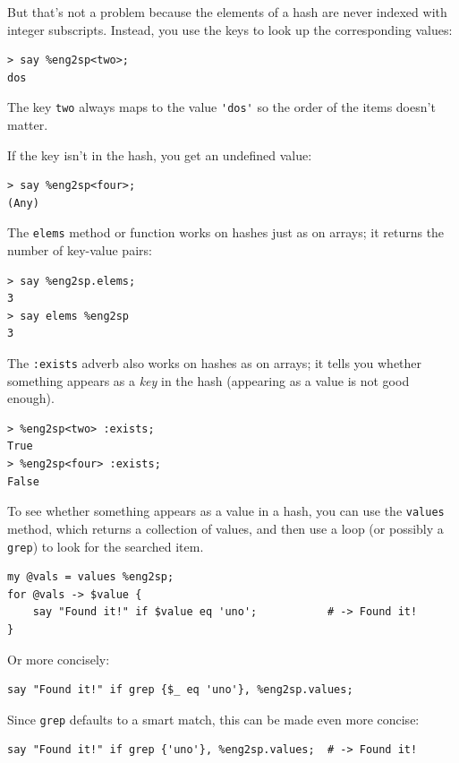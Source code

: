 But that's not a problem because the elements of a hash 
are never indexed with integer subscripts. Instead, you use 
the keys to look up the corresponding values:

\begin{verbatim}
> say %eng2sp<two>;
dos
\end{verbatim}
%
The key \verb"two" always maps to the value \verb"'dos'" 
so the order of the items doesn't matter.

If the key isn't in the hash, you get an undefined value:

\begin{verbatim}
> say %eng2sp<four>;
(Any)
\end{verbatim}
%
The {\tt elems} method or function works on hashes just 
as on arrays; it returns the number of key-value pairs:


\begin{verbatim}
> say %eng2sp.elems;
3
> say elems %eng2sp
3
\end{verbatim}
%
The {\tt :exists} adverb also works on hashes as on 
arrays; it tells you whether
something appears as a {\em key} in the hash (appearing
as a value is not good enough).

\begin{verbatim}
> %eng2sp<two> :exists;
True
> %eng2sp<four> :exists;
False
\end{verbatim}
%
To see whether something appears as a value in a hash, you
can use the {\tt values} method, which returns a collection of
values, and then use a loop (or possibly a {\tt grep}) to 
look for the searched item.

\begin{verbatim}
my @vals = values %eng2sp;
for @vals -> $value {
    say "Found it!" if $value eq 'uno';           # -> Found it!
}
\end{verbatim}
%
Or more concisely:
\begin{verbatim}
say "Found it!" if grep {$_ eq 'uno'}, %eng2sp.values;
\end{verbatim}

Since {\tt grep} defaults to a smart match, this can be 
made even more concise:

\begin{verbatim}
say "Found it!" if grep {'uno'}, %eng2sp.values;  # -> Found it!
\end{verbatim}


